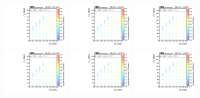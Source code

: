 \clearpage
\begin{figure}
    \begin{center}
            \includegraphics[width=0.30\textwidth]{Supplementary/CMS-SUS-16-038_Figure-aux_023-a}
            \includegraphics[width=0.30\textwidth]{Supplementary/CMS-SUS-16-038_Figure-aux_023-b}
            \includegraphics[width=0.30\textwidth]{Supplementary/CMS-SUS-16-038_Figure-aux_023-c}
            \includegraphics[width=0.30\textwidth]{Supplementary/CMS-SUS-16-038_Figure-aux_023-d}
            \includegraphics[width=0.30\textwidth]{Supplementary/CMS-SUS-16-038_Figure-aux_023-e}
            \includegraphics[width=0.30\textwidth]{Supplementary/CMS-SUS-16-038_Figure-aux_023-f}

\end{center}
\end{figure}
